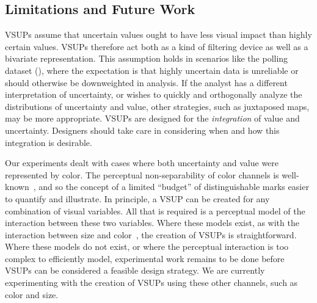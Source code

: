 
\subsection{Limitations and Future Work}

VSUPs assume that uncertain values ought to have less visual impact than highly certain values. VSUPs therefore act both as a kind of filtering device as well as a bivariate representation. This assumption holds in scenarios like the polling dataset (), where the expectation is that highly uncertain data is unreliable or should otherwise be downweighted in analysis. If the analyst has a different interpretation of uncertainty, or wishes to quickly and orthogonally analyze the distributions of uncertainty and value, other strategies, such as juxtaposed maps, may be more appropriate. VSUPs are designed for the \emph{integration} of value and uncertainty. Designers should take care in considering when and how this integration is desirable.

Our experiments dealt with cases where both uncertainty and value were represented by color. The perceptual non-separability of color channels is well-known~\cite{garner1970integrality, ware2012information}, and so the concept of a limited ``budget'' of distinguishable marks easier to quantify and illustrate. In principle, a VSUP can be created for any combination of visual variables. All that is required is a perceptual model of the interaction between these two variables. Where these models exist, as with the interaction between size and color~\cite{stone2014engineering}, the creation of VSUPs is straightforward. Where these models do not exist, or where the perceptual interaction is too complex to efficiently model, experimental work remains to be done before VSUPs can be considered a feasible design strategy. We are currently experimenting with the creation of VSUPs using these other channels, such as color and size.

